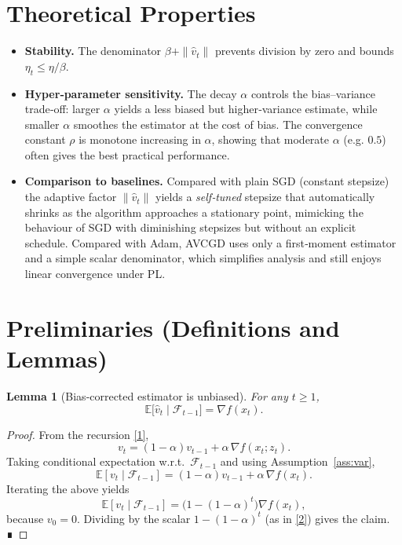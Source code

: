 \documentclass{article}
\newtheorem{lemma}{Lemma}
\newcommand{\E}{\mathbb{E}}
\begin{document}
\section*{Theoretical Properties}
\begin{itemize}
  \item \textbf{Stability.} The denominator $\beta+\|\hat v_{t}\|$ prevents
        division by zero and bounds $\eta_{t}\le \eta/\beta$.
  \item \textbf{Hyper‑parameter sensitivity.}
        The decay $\alpha$ controls the bias–variance trade‑off:
        larger $\alpha$ yields a less biased but higher‑variance estimate,
        while smaller $\alpha$ smoothes the estimator at the cost of bias.
        The convergence constant $\rho$ is monotone increasing in $\alpha$,
        showing that moderate $\alpha$ (e.g. $0.5$) often gives the best
        practical performance.
  \item \textbf{Comparison to baselines.}
        Compared with plain SGD (constant stepsize) the adaptive factor
        $\|\hat v_{t}\|$ yields a \emph{self‑tuned} stepsize that automatically
        shrinks as the algorithm approaches a stationary point, mimicking the
        behaviour of SGD with diminishing stepsizes but without an explicit
        schedule.
        Compared with Adam, AVCGD uses only a first‑moment estimator and a
        simple scalar denominator, which simplifies analysis and still
        enjoys linear convergence under PL.
\end{itemize}

\section*{Preliminaries (Definitions and Lemmas)}
\begin{lemma}[Bias‑corrected estimator is unbiased]\label{lem:unbiased}
For any $t\ge1$,
\[
\E\!\bigl[\hat v_{t}\mid\mathcal F_{t-1}\bigr]=\nabla f(x_{t}).
\]
\end{lemma}
\begin{proof}
From the recursion \eqref{1},
\[
v_{t}= (1-\alpha)v_{t-1}+\alpha\,\nabla f(x_{t};z_{t}).
\]
Taking conditional expectation w.r.t.\ $\mathcal F_{t-1}$ and using
Assumption~\ref{ass:var},
\[
\E[v_{t}\mid\mathcal F_{t-1}]
   =(1-\alpha)v_{t-1}+ \alpha\,\nabla f(x_{t}).
\]
Iterating the above yields
\[
\E[v_{t}\mid\mathcal F_{t-1}]
   =\bigl(1-(1-\alpha)^{t}\bigr)\nabla f(x_{t}),
\]
because $v_{0}=0$.  Dividing by the scalar $1-(1-\alpha)^{t}$
(as in \eqref{2}) gives the claim.  ∎
\end{proof}
\end{document}
